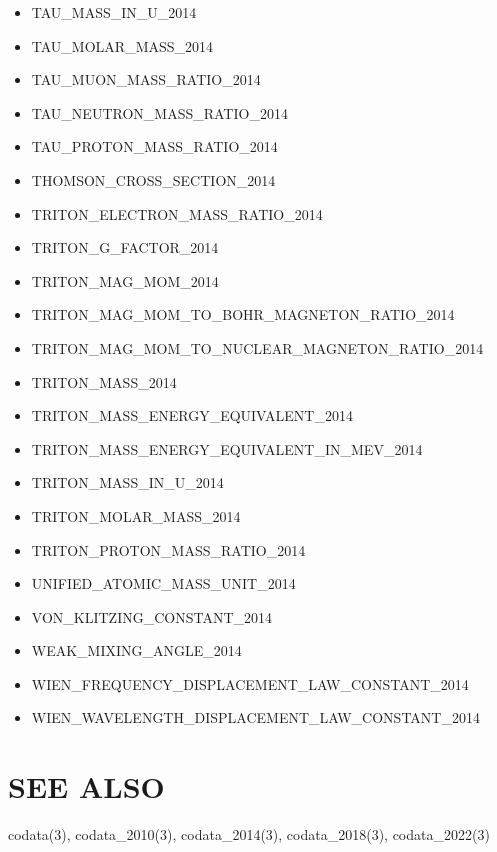 \begin{itemize}
\item TAU\_MASS\_IN\_U\_2014
\item TAU\_MOLAR\_MASS\_2014
\item TAU\_MUON\_MASS\_RATIO\_2014
\item TAU\_NEUTRON\_MASS\_RATIO\_2014
\item TAU\_PROTON\_MASS\_RATIO\_2014
\item THOMSON\_CROSS\_SECTION\_2014
\item TRITON\_ELECTRON\_MASS\_RATIO\_2014
\item TRITON\_G\_FACTOR\_2014
\item TRITON\_MAG\_MOM\_2014
\item TRITON\_MAG\_MOM\_TO\_BOHR\_MAGNETON\_RATIO\_2014
\item TRITON\_MAG\_MOM\_TO\_NUCLEAR\_MAGNETON\_RATIO\_2014
\item TRITON\_MASS\_2014
\item TRITON\_MASS\_ENERGY\_EQUIVALENT\_2014
\item TRITON\_MASS\_ENERGY\_EQUIVALENT\_IN\_MEV\_2014
\item TRITON\_MASS\_IN\_U\_2014
\item TRITON\_MOLAR\_MASS\_2014
\item TRITON\_PROTON\_MASS\_RATIO\_2014
\item UNIFIED\_ATOMIC\_MASS\_UNIT\_2014
\item VON\_KLITZING\_CONSTANT\_2014
\item WEAK\_MIXING\_ANGLE\_2014
\item WIEN\_FREQUENCY\_DISPLACEMENT\_LAW\_CONSTANT\_2014
\item WIEN\_WAVELENGTH\_DISPLACEMENT\_LAW\_CONSTANT\_2014
\end{itemize}

\section*{SEE ALSO}
codata(3), codata\_2010(3), codata\_2014(3), codata\_2018(3), codata\_2022(3)
